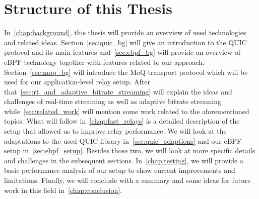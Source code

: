 \section{Structure of this Thesis}\label{sec:structure_of_thesis}

In~\autoref{chap:background}, this thesis will provide an overview of used technologies
and related ideas.
Section~\ref{sec:quic_bg} will give an introduction to the QUIC protocol and its main features 
and~\autoref{sec:ebpf_bg} will provide an overview of eBPF technology together with features related to 
our approach.
Section~\ref{sec:moq_bg} will introduce the MoQ transport protocol which will be used 
for our application-level relay setup.
After that~\autoref{sec:rt_and_adaptive_bitrate_streaming} will explain the ideas and challenges of 
real-time streaming as well as adaptive bitrate streaming while~\autoref{sec:related_work} will 
mention some work related to the aforementioned topics.
What will follow in~\autoref{chap:fast_relays} is a detailed description of the setup that 
allowed us to improve relay performance. 
We will look at the adaptations to the used QUIC library in~\autoref{sec:quic_adaptions} and 
our eBPF setup in~\autoref{sec:ebpf_setup}. Besides those two, we will look at more specific details and challenges in the subsequent sections.
In~\autoref{chap:testing}, we will provide a basic performance analysis of our setup to show current improvements and limitations.
Finally, we will conclude with a summary and some ideas for future work in this field in~\autoref{chap:conclusion}.